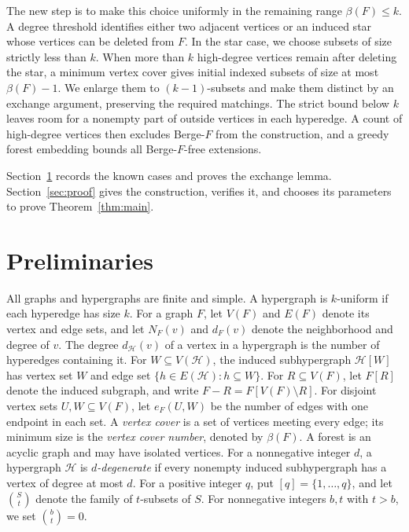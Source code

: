 \documentclass[11pt,a4paper]{article}
\numberwithin{equation}{section}
\theoremstyle{definition}
\theoremstyle{plain}
\newcommand{\HH}{\mathcal H}
\begin{document}
The new step is to make this choice uniformly in the remaining range
$\beta(F)\le k$. A degree threshold identifies either two adjacent
vertices or an induced star whose vertices can be deleted from $F$.
In the star case, we choose subsets of size strictly less than $k$.
When more than $k$ high-degree vertices remain after deleting the star,
a minimum vertex cover gives initial indexed subsets of size at most
$\beta(F)-1$. We enlarge them to $(k-1)$-subsets and make them distinct
by an exchange argument, preserving the required matchings.
The strict bound below $k$ leaves room for a nonempty part of outside
vertices in each hyperedge. A count of high-degree vertices then excludes
Berge-$F$ from the construction, and a greedy forest embedding bounds
all Berge-$F$-free extensions.

Section~\ref{sec:prelim} records the known cases and proves the exchange
lemma. Section~\ref{sec:proof} gives the construction, verifies it, and
chooses its parameters to prove Theorem~\ref{thm:main}.

\section{Preliminaries}\label{sec:prelim}

All graphs and hypergraphs are finite and simple. A hypergraph is
$k$-uniform if each hyperedge has size $k$.
For a graph $F$, let $V(F)$ and $E(F)$ denote its vertex and edge sets,
and let $N_F(v)$ and $d_F(v)$ denote the neighborhood and degree of $v$.
The degree $d_{\HH}(v)$ of a vertex in a hypergraph is the number of
hyperedges containing it. For $W\subseteq V(\HH)$, the induced
subhypergraph $\HH[W]$ has vertex set $W$ and edge set
$\{h\in E(\HH):h\subseteq W\}$. For $R\subseteq V(F)$, let $F[R]$ denote
the induced subgraph, and write $F-R=F[V(F)\setminus R]$.
For disjoint vertex sets $U,W\subseteq V(F)$, let $e_F(U,W)$ be the
number of edges with one endpoint in each set.
A \emph{vertex cover} is a set of vertices meeting every edge;
its minimum size is the \emph{vertex cover number}, denoted by $\beta(F)$.
A forest is an acyclic graph and may have isolated vertices.
For a nonnegative integer $d$, a hypergraph $\HH$ is
\emph{$d$-degenerate} if every nonempty induced subhypergraph has a
vertex of degree at most $d$. 
For a positive integer $q$, put $[q]=\{1,\ldots,q\}$, and let
$\binom St$ denote the family of $t$-subsets of $S$.
For nonnegative integers $b,t$ with $t>b$, we set $\binom bt=0$.
\end{document}
